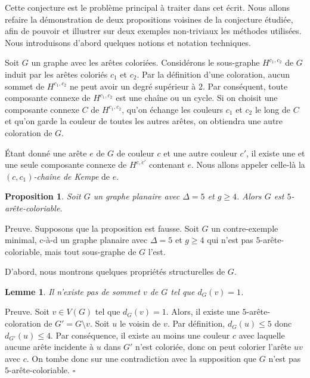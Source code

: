 \documentclass[10pt,a4paper]{article}
\newtheorem{proposition}{Proposition}
\newtheorem{lemme}{Lemme}
\newcommand{\ep}{{\hfill $\square$}}
\begin{document}
Cette conjecture est le problème principal à traiter dans cet écrit. 
Nous allons refaire la démonstration de deux propositions voisines de la conjecture étudiée, afin de pouvoir et illustrer sur deux exemples non-triviaux les méthodes utilisées. Nous introduisons d'abord quelques notions et notation techniques.

Soit $G$ un graphe avec les arêtes coloriées. 
Considérons le sous-graphe $H^{c_1,c_2}$ de $G$ induit par les arêtes coloriés $c_1$ et $c_2$. Par la définition d'une coloration, aucun sommet de $H^{c_1,c_2}$ ne peut avoir un degré supérieur à 2. Par conséquent, toute composante connexe de $H^{c_1,c_2}$ est une chaîne ou un cycle. Si on choisit une composante connexe $C$ de $H^{c_1,c_2}$, qu'on échange les couleurs $c_1$ et $c_2$ le long de $C$ et qu'on garde la couleur de toutes les autres arêtes, on obtiendra une autre coloration de $G$.

Étant donné une arête $e$ de $G$ de couleur $c$ et une autre couleur $c'$, il existe une et une seule composante connexe de $H^{c,c'}$ contenant $e$.
Nous allons appeler celle-là la \emph{$(c,c_1)$-chaîne de Kempe} de $e$. 




\begin{proposition}
Soit $G$ un graphe planaire avec $\Delta = 5$ et $g \geq 4$. Alors $G$ est $5$-arête-coloriable.
\end{proposition}

Preuve. Supposons que la proposition est fausse. Soit $G$ un contre-exemple minimal, c-à-d un graphe planaire avec $\Delta = 5$ et $g \geq 4$ qui n'est pas $5$-arête-coloriable, mais tout sous-graphe de $G$ l'est.

D'abord, nous montrons quelques propriétés structurelles de $G$.

\begin{lemme}
Il n'existe pas de sommet $v$ de $G$ tel que $d_G(v) = 1$.
\label{le:1}
\end{lemme}

Preuve. Soit $v \in V(G)$ tel que $d_G(v) = 1$. Alors, il existe une $5$-arête-coloration de $G'=G \setminus v$. Soit $u$ le voisin de $v$. Par définition, $d_G(u) \leq 5$ donc $d_{G'}(u) \leq 4$. Par conséquence, il existe au moins une couleur $c$ avec laquelle aucune arête incidente à $u$ dans $G'$ n'est coloriée, donc on peut colorier l'arête $uv$ avec $c$. On tombe donc sur une contradiction avec la supposition que $G$ n'est pas $5$-arête-coloriable.
\ep
\end{document}
